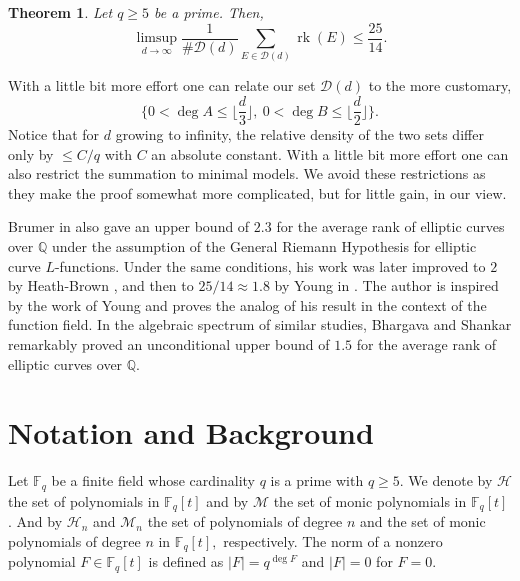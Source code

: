 \documentclass[12pt,reqno]{amsart}
\newcommand{\BF}{\mathbb{F}}
\newcommand{\CM}{\mathcal{M}}
\newcommand{\CH}{\mathcal{H}}
\DeclareMathOperator{\rk}{rk}
\newtheorem{thm}[lem]{Theorem}
\begin{document}
\begin{thm}
    Let $q \geq 5$ be a prime. Then, 
    $$
        \limsup_{d \rightarrow \infty} \frac{1}{\#\mathcal{D}(d)} \sum_{E \in \mathcal{D}(d)} \rk(E) \leq  \frac{25}{14}.
    $$
\end{thm}

With a little bit more effort one can relate our set $\mathcal{D}(d)$ to the more customary, 
$$
\{ 0 < \deg A \leq \big \lfloor \frac{d}{3} \big \rfloor , \ 0 < \deg B \leq \big \lfloor \frac{d}{2} \big \rfloor \}.
$$
Notice that for $d$ growing to infinity, the relative density of the two sets differ only by $\leq C / q$ with $C$ an absolute constant. With a little bit more effort one can also restrict the summation to minimal models. We avoid these restrictions as they make the proof somewhat more complicated, but for little gain, in our view. 

Brumer in \cite{Brumer} also gave an upper bound of $2.3$ for the average rank of elliptic curves over $\mathbb{Q}$  under the assumption of the General Riemann Hypothesis for elliptic curve $L$-functions. Under the same conditions, his work was later improved to $2$ by Heath-Brown \cite{HBrown}, and then to $25/14 \approx 1.8$ by Young in \cite{Matthew}. The author is inspired by the work of Young \cite{Matthew} and proves the analog of his result in the context of the function field. In the algebraic spectrum of similar studies, Bhargava and Shankar \cite{Bha-Shankar} remarkably proved an unconditional upper bound of $1.5$ for the average rank of elliptic curves over $\mathbb{Q}$. %


\section{Notation and Background}

Let $\BF_{q}$ be a finite field whose cardinality $q$ is a prime with $q \geq 5.$ We denote by $\CH$ the set of polynomials in $\BF_{q}[t]$ and by $\CM$ the set of monic polynomials in $\BF_{q}[t]$. And by $\CH_{n}$ and $\CM_{n}$ the set of polynomials of degree $n$ and the set of monic polynomials of degree $n$ in $\BF_{q}[t],$ respectively. The norm of a nonzero polynomial $F \in \BF_{q}[t]$ is defined as $|F| = q^{\deg F}$ and $|F|=0$ for $F=0$.

\end{document}
